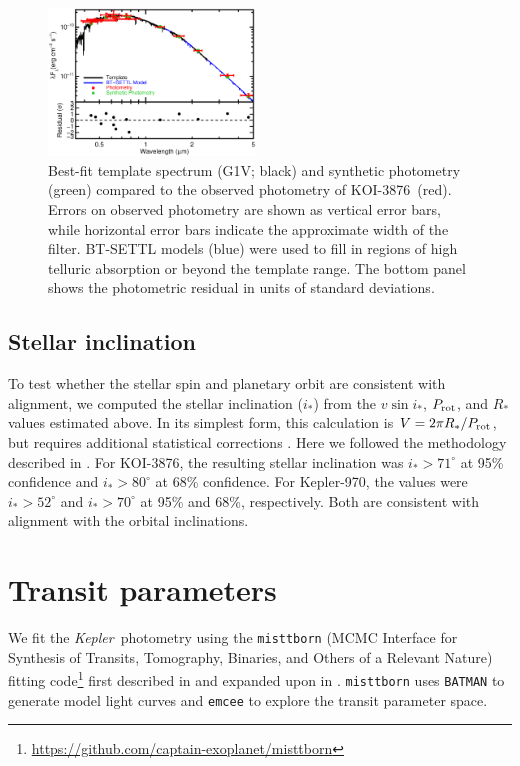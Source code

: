 \documentclass[twocolumn, linenumbers]{aastex631}
\newcommand{\starname}{KOI-3876}
\newcommand{\starnametwo}{Kepler-970}
\newcommand{\vsini}{$v\sin{i_*}$}
\newcommand{\kepler}{{\it Kepler}}
\begin{document}
\begin{figure}[tb]
    \centering
    \includegraphics[width=0.49\textwidth]{KOI3876_SED.eps}
    \caption{Best-fit template spectrum (G1V; black) and synthetic photometry (green) compared to the observed photometry of \starname\ (red). Errors on observed photometry are shown as vertical error bars, while horizontal error bars indicate the approximate width of the filter. BT-SETTL models (blue) were used to fill in regions of high telluric absorption or beyond the template range. The bottom panel shows the photometric residual in units of standard deviations. }
    \label{fig:sed}
\end{figure} 


\subsection{Stellar inclination}\label{sec:inc}

To test whether the stellar spin and planetary orbit are consistent with alignment, we computed the stellar inclination ($i_*$) from the \vsini, $P_{\rm{rot}}$, and $R_*$ values estimated above. In its simplest form, this calculation is $V=2\pi R_*/P_{\rm{rot}}$, but requires additional statistical corrections \citep[see ][]{MortonWinn2014, 2020AJ....159...81M}. Here we followed the methodology described in \citet{2020AJ....159...81M}. For \starname, the resulting stellar inclination was $i_*>71^\circ$ at 95\% confidence and $i_*>80^\circ$ at 68\% confidence. For \starnametwo, the values were $i_*>52^\circ$ and $i_*>70^\circ$ at 95\% and 68\%, respectively. Both are consistent with alignment with the orbital inclinations. 

\section{Transit parameters}\label{sec:transit}

We fit the \kepler\ photometry using the \texttt{misttborn} (MCMC Interface for Synthesis of Transits, Tomography, Binaries, and Others of a Relevant Nature) fitting code\footnote{\url{https://github.com/captain-exoplanet/misttborn}} first described in \citet{Mann2016a} and expanded upon in \citet{MISTTBORN}. \texttt{misttborn} uses \texttt{BATMAN} \citep{Kreidberg2015} to generate model light curves and \texttt{emcee} \citep{Foreman-Mackey2013} to explore the transit parameter space. 
\end{document}
